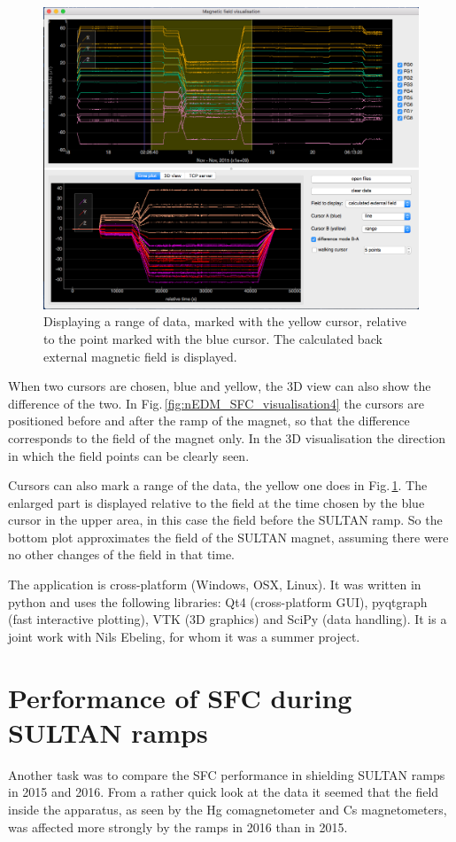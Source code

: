 \begin{figure}
  \centering
  \includegraphics[width=0.8\linewidth]{gfx/nEDM_SFC/visualisation/visualisation3.png}
  \caption{Displaying a range of data, marked with the yellow cursor, relative to the point marked with the blue cursor. The calculated back external magnetic field is displayed.}\label{fig:nEDM_SFC_visualisation3}
\end{figure}

When two cursors are chosen, blue and yellow, the 3D view can also show the difference of the two. In Fig.\,\ref{fig:nEDM_SFC_visualisation4} the cursors are positioned before and after the ramp of the magnet, so that the difference corresponds to the field of the magnet only. In the 3D visualisation the direction in which the field points can be clearly seen.

Cursors can also mark a range of the data, the yellow one does in Fig.\,\ref{fig:nEDM_SFC_visualisation3}. The enlarged part is displayed relative to the field at the time chosen by the blue cursor in the upper area, in this case the field before the SULTAN ramp. So the bottom plot approximates the field of the SULTAN magnet, assuming there were no other changes of the field in that time. 

The application is cross-platform (Windows, OSX, Linux). It was written in python and uses the following libraries: Qt4 (cross-platform GUI), pyqtgraph (fast interactive plotting), VTK (3D graphics) and SciPy (data handling). It is a joint work with Nils Ebeling, for whom it was a summer project.






\chapter{Performance of SFC during SULTAN ramps}
Another task was to compare the SFC performance in shielding SULTAN ramps in 2015 and 2016. From a rather quick look at the data it seemed that the field inside the apparatus, as seen by the Hg comagnetometer and Cs magnetometers, was affected more strongly by the ramps in 2016 than in 2015.

